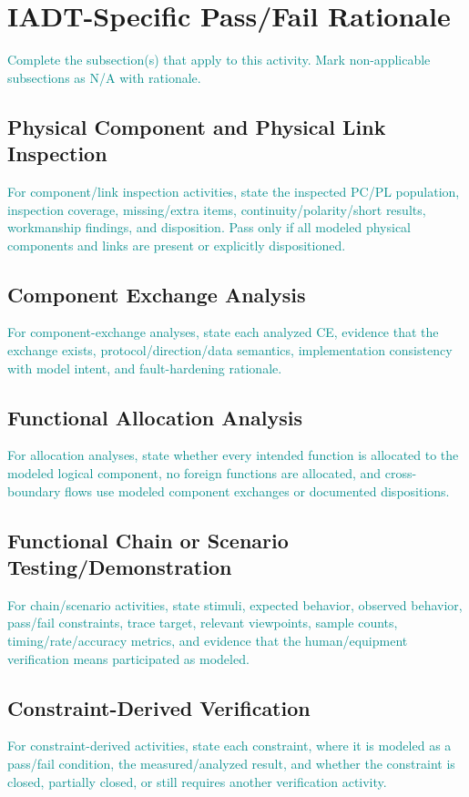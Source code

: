 \documentclass{../common/latex/delta_base_styles/delta_base_styles}
\newcommand{\placeholder}[1]{\textcolor{DarkCyan}{#1}}
\begin{document}
\section{IADT-Specific Pass/Fail Rationale}
\placeholder{Complete the subsection(s) that apply to this activity. Mark non-applicable subsections as N/A with rationale.}

\subsection{Physical Component and Physical Link Inspection}
\placeholder{For component/link inspection activities, state the inspected PC/PL population, inspection coverage, missing/extra items, continuity/polarity/short results, workmanship findings, and disposition. Pass only if all modeled physical components and links are present or explicitly dispositioned.}

\subsection{Component Exchange Analysis}
\placeholder{For component-exchange analyses, state each analyzed CE, evidence that the exchange exists, protocol/direction/data semantics, implementation consistency with model intent, and fault-hardening rationale.}

\subsection{Functional Allocation Analysis}
\placeholder{For allocation analyses, state whether every intended function is allocated to the modeled logical component, no foreign functions are allocated, and cross-boundary flows use modeled component exchanges or documented dispositions.}

\subsection{Functional Chain or Scenario Testing/Demonstration}
\placeholder{For chain/scenario activities, state stimuli, expected behavior, observed behavior, pass/fail constraints, trace target, relevant viewpoints, sample counts, timing/rate/accuracy metrics, and evidence that the human/equipment verification means participated as modeled.}

\subsection{Constraint-Derived Verification}
\placeholder{For constraint-derived activities, state each constraint, where it is modeled as a pass/fail condition, the measured/analyzed result, and whether the constraint is closed, partially closed, or still requires another verification activity.}
\end{document}
